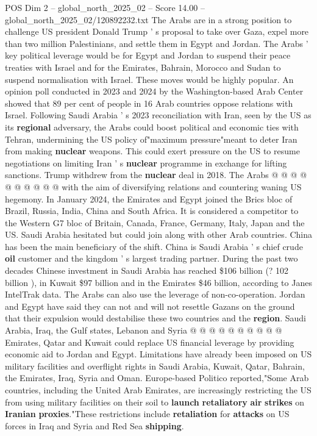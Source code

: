 \begin{textsample}{POS Dim 2 – global\_north\_2025\_02 – Score 14.00 – global\_north\_2025\_02/120892232.txt}  \label{ex:f2_pos_434}
The Arabs are in a strong position to challenge US president Donald Trump ' s proposal to take over Gaza, expel more than two million Palestinians, and settle them in Egypt and Jordan.
The Arabs ' key political leverage would be for Egypt and Jordan to suspend their peace treaties with Israel and for the Emirates, Bahrain, Morocco and Sudan to suspend normalisation with Israel.
These moves would be highly popular.
An opinion poll conducted in 2023 and 2024 by the Washington-based Arab Center showed that 89 per cent of people in 16 Arab countries oppose relations with Israel.
Following Saudi Arabia ' s 2023 reconciliation with Iran, seen by the US as its \textbf{regional} adversary, the Arabs could boost political and economic ties with Tehran, undermining the US policy of"maximum pressure"meant to deter Iran from making \textbf{nuclear} weapons.
This could exert pressure on the US to resume negotiations on limiting Iran ' s \textbf{nuclear} programme in exchange for lifting sanctions.
Trump withdrew from the \textbf{nuclear} deal in 2018.
The Arabs @ @ @ @ @ @ @ @ @ @ with the aim of diversifying relations and countering waning US hegemony.
In January 2024, the Emirates and Egypt joined the Brics bloc of Brazil, Russia, India, China and South Africa.
It is considered a competitor to the Western G7 bloc of Britain, Canada, France, Germany, Italy, Japan and the US.
Saudi Arabia hesitated but could join along with other Arab countries.
China has been the main beneficiary of the shift.
China is Saudi Arabia ' s chief crude \textbf{oil} customer and the kingdom ' s largest trading partner.
During the past two decades Chinese investment in Saudi Arabia has reached \$106 billion (? 102 billion ), in Kuwait \$97 billion and in the Emirates \$46 billion, according to Janes IntelTrak data.
The Arabs can also use the leverage of non-co-operation.
Jordan and Egypt have said they can not and will not resettle Gazans on the ground that their expulsion would destabilise these two countries and the \textbf{region}.
Saudi Arabia, Iraq, the Gulf states, Lebanon and Syria @ @ @ @ @ @ @ @ @ @ Emirates, Qatar and Kuwait could replace US financial leverage by providing economic aid to Jordan and Egypt.
Limitations have already been imposed on US military facilities and overflight rights in Saudi Arabia, Kuwait, Qatar, Bahrain, the Emirates, Iraq, Syria and Oman.
Europe-based Politico reported,"Some Arab countries, including the United Arab Emirates, are increasingly restricting the US from using military facilities on their soil to \textbf{launch} \textbf{retaliatory} \textbf{air} \textbf{strikes} on \textbf{Iranian} \textbf{proxies}."These restrictions include \textbf{retaliation} for \textbf{attacks} on US forces in Iraq and Syria and Red Sea \textbf{shipping}.

\end{textsample}
